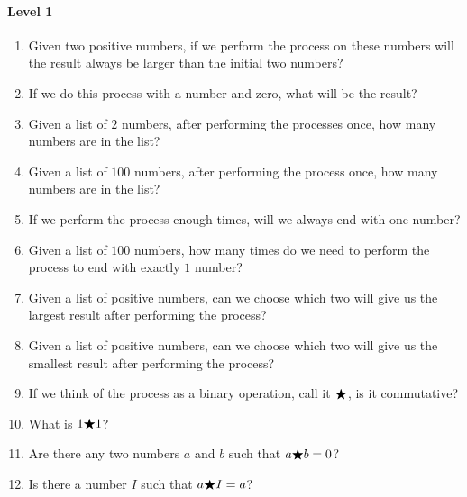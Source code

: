\documentclass[nooutcomes]{ximera}
\begin{document}
\begin{problem}
\begin{freeResponse}
  \paragraph{Level 1}
  \begin{enumerate}
    \item Given two positive numbers, if we perform the process on
      these numbers will the result always be larger than the initial
      two numbers?
    \item If we do this process with a number and zero, what will be
      the result?
    \item Given a list of $2$ numbers, after performing the processes
      once, how many numbers are in the list?
    \item Given a list of $100$ numbers, after performing the process
      once, how many numbers are in the list?
    \item If we perform the process enough times, will we always end
      with one number?
    \item Given a list of $100$ numbers, how many times do we need to
      perform the process to end with exactly $1$ number?
    \item Given a list of positive numbers, can we choose which two
      will give us the largest result after performing the process?
    \item Given a list of positive numbers, can we choose which two
      will give us the smallest result after performing the process?
    \item If we think of the process as a binary operation, call it
      $\bigstar$, is it commutative?
    \item What is $1 \bigstar 1$?
    \item Are there any two numbers $a$ and $b$ such that $a\bigstar b = 0$?
    \item Is there a number $I$ such that $a\bigstar I= a$?
  \end{enumerate}


\end{freeResponse}
\end{problem}
\end{document}
